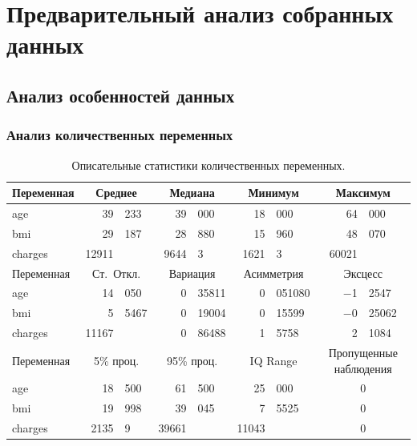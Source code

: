 \documentclass[a4paper,12pt]{article}
\begin{document}
\section{Предварительный анализ собранных данных}
\subsection{Анализ особенностей данных}
\subsubsection{Анализ количественных переменных}

\begin{table}[H]
	\begin{center}
		\begin{tabular}{|l|r@{,}l|r@{,}l|r@{,}l|r@{,}l|}
			\hline
			Переменная & \multicolumn{2}{c|}{Среднее}
			& \multicolumn{2}{c|}{Медиана}
			& \multicolumn{2}{c|}{Минимум}
			& \multicolumn{2}{c|}{Максимум} \\[1ex]
			\hline
			age & 39&233 & 39&000 & 18&000 & 64&000\\
			bmi & 29&187 & 28&880 & 15&960 & 48&070\\
			charges & 12911& & 9644&3 & 1621&3 & 60021&\\[10pt]
			\hline
			Переменная &  \multicolumn{2}{c|}{Ст.\ Откл.}
			& \multicolumn{2}{c|}{Вариация}
			& \multicolumn{2}{c|}{Асимметрия}
			& \multicolumn{2}{c|}{Эксцесс} \\[1ex]
			\hline
			age & 14&050 & 0&35811 & 0&051080 & $-$1&2547\\
			bmi & 5&5467 & 0&19004 & 0&15599 & $-$0&25062\\
			charges & 11167& & 0&86488 & 1&5758 & 2&1084\\[10pt]
			\hline
			Переменная &  \multicolumn{2}{c|}{5\% проц.}
			& \multicolumn{2}{c|}{95\% проц.}
			& \multicolumn{2}{c|}{IQ Range}
			& \multicolumn{2}{c|}{Пропущенные наблюдения} \\[1ex]
			\hline
			age & 18&500 & 61&500 & 25&000 & \multicolumn{2}{c|}{0}\\
			bmi & 19&998 & 39&045 & 7&5525 & \multicolumn{2}{c|}{0}\\
			charges & 2135&9 & 39661& & 11043& & \multicolumn{2}{c|}{0}\\
			\hline
		\end{tabular}
	\end{center}
	\caption{Описательные статистики количественных переменных.}
	\label{tab:table2}
\end{table}
\end{document}
